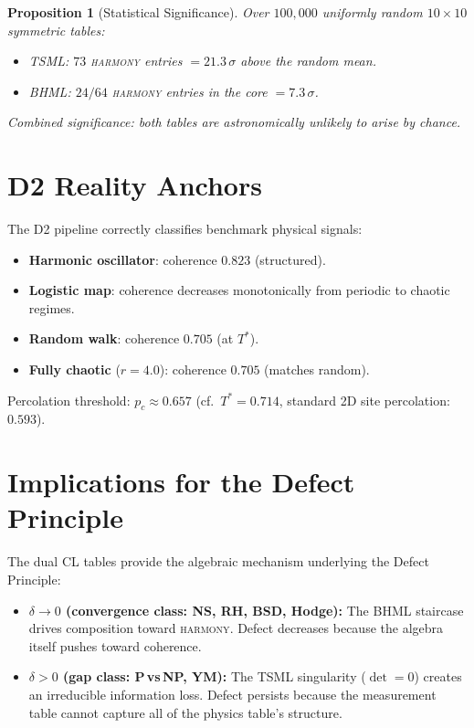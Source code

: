 \documentclass[12pt, openany]{book}
\newtheorem{proposition}[theorem]{Proposition}
\theoremstyle{remark}
\begin{document}
\begin{proposition}[Statistical Significance]
\label{prop:significance}
Over $100{,}000$ uniformly random $10\times 10$ symmetric tables:
\begin{itemize}
  \item TSML: $73$ \textsc{harmony} entries $= 21.3\,\sigma$ above the random
        mean.
  \item BHML: $24/64$ \textsc{harmony} entries in the core $= 7.3\,\sigma$.
\end{itemize}
Combined significance: both tables are astronomically unlikely to arise by
chance.
\end{proposition}

\section{D2 Reality Anchors}
\label{sec:d2-anchors}

The D2 pipeline correctly classifies benchmark physical signals:
\begin{itemize}
  \item \textbf{Harmonic oscillator}: coherence $0.823$ (structured).
  \item \textbf{Logistic map}: coherence decreases monotonically from periodic
        to chaotic regimes.
  \item \textbf{Random walk}: coherence $0.705$ (at $T^*$).
  \item \textbf{Fully chaotic} ($r = 4.0$): coherence $0.705$ (matches random).
\end{itemize}
Percolation threshold: $p_c \approx 0.657$ (cf.\ $T^* = 0.714$, standard 2D
site percolation: $0.593$).

\section{Implications for the Defect Principle}
\label{sec:implications}

The dual CL tables provide the algebraic mechanism underlying the Defect
Principle:

\begin{itemize}
  \item \textbf{$\delta \to 0$ (convergence class: NS, RH, BSD, Hodge):}
        The BHML staircase drives composition toward \textsc{harmony}.  Defect
        decreases because the algebra itself pushes toward coherence.
  \item \textbf{$\delta > 0$ (gap class: P\,vs\,NP, YM):}
        The TSML singularity ($\det = 0$) creates an irreducible information
        loss.  Defect persists because the measurement table cannot capture all
        of the physics table's structure.
\end{itemize}
\end{document}
